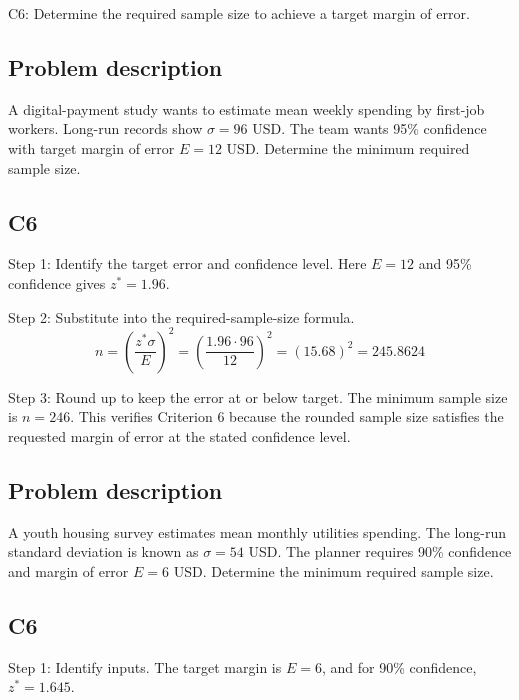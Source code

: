 


	\begin{ExamCriteria}
		\item C6: Determine the required sample size to achieve a target margin of error.
	\end{ExamCriteria}

	\begin{ExamProblems}
		\item
		\subsection*{Problem description}
		A digital-payment study wants to estimate mean weekly spending by first-job workers. Long-run records show $\sigma = 96$ USD. The team wants 95\% confidence with target margin of error $E = 12$ USD. Determine the minimum required sample size.

		\subsection*{C6}
		Step 1: Identify the target error and confidence level. Here $E = 12$ and 95\% confidence gives $z^* = 1.96$.

		Step 2: Substitute into the required-sample-size formula.
		\[
		n = \left(\frac{z^*\sigma}{E}\right)^2
		= \left(\frac{1.96 \cdot 96}{12}\right)^2
		= \left(15.68\right)^2
		= 245.8624
		\]

		Step 3: Round up to keep the error at or below target. The minimum sample size is $n = 246$. This verifies Criterion 6 because the rounded sample size satisfies the requested margin of error at the stated confidence level.

		\item
		\subsection*{Problem description}
		A youth housing survey estimates mean monthly utilities spending. The long-run standard deviation is known as $\sigma = 54$ USD. The planner requires 90\% confidence and margin of error $E = 6$ USD. Determine the minimum required sample size.

		\subsection*{C6}
		Step 1: Identify inputs. The target margin is $E = 6$, and for 90\% confidence, $z^* = 1.645$.


\end{ExamProblems}
